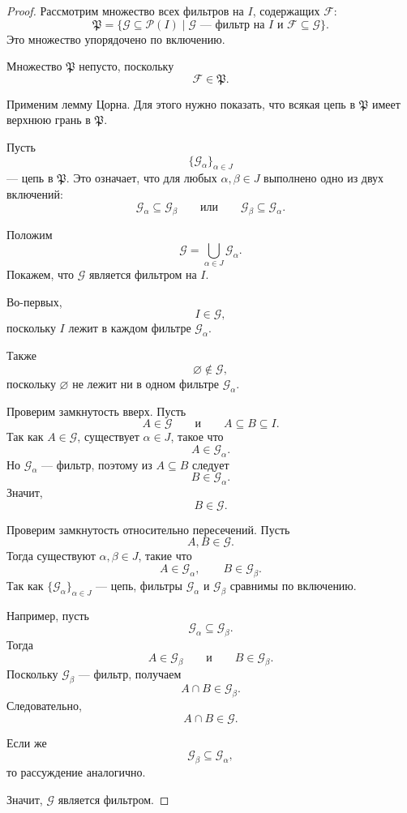 \documentclass[12pt,a4paper,oneside,openany]{book}
\theoremstyle{definition}
\theoremstyle{plain}
\theoremstyle{remark}
\begin{document}
\begin{proof}
Рассмотрим множество всех фильтров на $I$, содержащих $\mathcal F$:
\[
\mathfrak P
=
\{\mathcal G\subseteq\mathcal P(I)\mid
\mathcal G\text{ — фильтр на }I
\text{ и }
\mathcal F\subseteq\mathcal G\}.
\]
Это множество упорядочено по включению.

Множество $\mathfrak P$ непусто, поскольку
\[
\mathcal F\in\mathfrak P.
\]

Применим лемму Цорна. Для этого нужно показать, что всякая цепь в $\mathfrak P$ имеет верхнюю грань в $\mathfrak P$.

Пусть
\[
\{\mathcal G_\alpha\}_{\alpha\in J}
\]
— цепь в $\mathfrak P$. Это означает, что для любых $\alpha,\beta\in J$ выполнено одно из двух включений:
\[
\mathcal G_\alpha\subseteq\mathcal G_\beta
\qquad
\text{или}
\qquad
\mathcal G_\beta\subseteq\mathcal G_\alpha.
\]

Положим
\[
\mathcal G
=
\bigcup_{\alpha\in J}\mathcal G_\alpha.
\]
Покажем, что $\mathcal G$ является фильтром на $I$.

Во-первых,
\[
I\in\mathcal G,
\]
поскольку $I$ лежит в каждом фильтре $\mathcal G_\alpha$.

Также
\[
\varnothing\notin\mathcal G,
\]
поскольку $\varnothing$ не лежит ни в одном фильтре $\mathcal G_\alpha$.

Проверим замкнутость вверх. Пусть
\[
A\in\mathcal G
\qquad
\text{и}
\qquad
A\subseteq B\subseteq I.
\]
Так как $A\in\mathcal G$, существует $\alpha\in J$, такое что
\[
A\in\mathcal G_\alpha.
\]
Но $\mathcal G_\alpha$ — фильтр, поэтому из $A\subseteq B$ следует
\[
B\in\mathcal G_\alpha.
\]
Значит,
\[
B\in\mathcal G.
\]

Проверим замкнутость относительно пересечений. Пусть
\[
A,B\in\mathcal G.
\]
Тогда существуют $\alpha,\beta\in J$, такие что
\[
A\in\mathcal G_\alpha,
\qquad
B\in\mathcal G_\beta.
\]
Так как $\{\mathcal G_\alpha\}_{\alpha\in J}$ — цепь, фильтры $\mathcal G_\alpha$ и $\mathcal G_\beta$ сравнимы по включению.

Например, пусть
\[
\mathcal G_\alpha\subseteq\mathcal G_\beta.
\]
Тогда
\[
A\in\mathcal G_\beta
\qquad
\text{и}
\qquad
B\in\mathcal G_\beta.
\]
Поскольку $\mathcal G_\beta$ — фильтр, получаем
\[
A\cap B\in\mathcal G_\beta.
\]
Следовательно,
\[
A\cap B\in\mathcal G.
\]

Если же
\[
\mathcal G_\beta\subseteq\mathcal G_\alpha,
\]
то рассуждение аналогично.

Значит, $\mathcal G$ является фильтром.


\end{proof}
\end{document}
